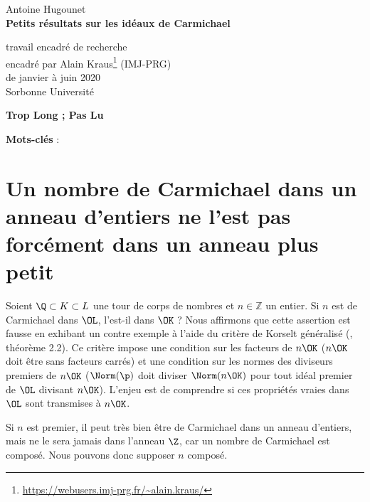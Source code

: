\documentclass[a4paper, 12pt, oneside]{article}
\begin{document}
\begin{titlepage}
\begin{center}
	\large Antoine Hugounet \\

	\vspace{40px}
	\LARGE \textbf{Petits résultats sur les idéaux de Carmichael}

	\vspace{40px}
	\large
	travail encadré de recherche \\
	encadré par Alain Kraus\footnote{\url{https://webusers.imj-prg.fr/~alain.kraus/}} (IMJ-PRG) \\
	de janvier à juin 2020 \\

	\vspace{20px}
	Sorbonne Université
\end{center}

\normalsize
\vspace{80px}
\begin{center} \textbf{Trop Long ; Pas Lu} \end{center}
\vspace{-1em}

\vfill
\begin{center}
	\normalsize \textbf{Mots-clés} : \textit{}
\end{center}
\end{titlepage}

\section{Un nombre de Carmichael dans un anneau d'entiers ne l'est pas forcément dans un anneau plus petit}

Soient $\Q \subset K \subset L$ une tour de corps de nombres et $n\in \mathbb{Z}$ un entier. Si $n$ est de Carmichael dans $\OL$, l'est-il dans $\OK$ ? Nous affirmons que cette assertion est fausse en exhibant un contre exemple à l'aide du critère de Korselt généralisé (\cite{article}, théorème 2.2). Ce critère impose une condition sur les facteurs de $n\OK$ ($n\OK$ doit être sans facteurs carrés) et une condition sur les normes des diviseurs premiers de $n\OK$ ($\Norm(\p)$ doit diviser $\Norm(n\OK)$ pour tout idéal premier de $\OL$ divisant $n\OK$). L'enjeu est de comprendre si ces propriétés vraies dans $\OL$ sont transmises à $n\OK$.

\begin{remarque}Si $n$ est premier, il peut très bien être de Carmichael dans un anneau d'entiers, mais ne le sera jamais dans l'anneau $\Z$, car un nombre de Carmichael est composé. Nous pouvons donc supposer $n$ composé. \end{remarque}
\end{document}
